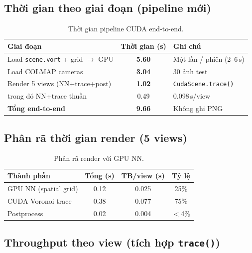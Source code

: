 \documentclass[11pt,a4paper]{article}
\begin{document}
\subsection{Thời gian theo giai đoạn (pipeline mới)}

\begin{table}[H]
\centering
\caption{Thời gian pipeline CUDA end-to-end.}
\label{tab:timing-phase}
\begin{tabular}{lcl}
\toprule
\textbf{Giai đoạn} & \textbf{Thời gian (s)} & \textbf{Ghi chú} \\
\midrule
Load \texttt{scene.vort} + grid $\rightarrow$ GPU & \textbf{5.60} & Một lần / phiên (2--6\,s) \\
Load COLMAP cameras & \textbf{3.04} & 30 ảnh test \\
Render 5 views (NN+trace+post) & \textbf{1.02} & \texttt{CudaScene.trace()} \\
\quad trong đó NN+trace thuần & 0.49 & 0.098\,s/view \\
\midrule
\textbf{Tổng end-to-end} & \textbf{9.66} & Không ghi PNG \\
\bottomrule
\end{tabular}
\end{table}

\subsection{Phân rã thời gian render (5 views)}

\begin{table}[H]
\centering
\caption{Phân rã render với GPU NN.}
\label{tab:timing-breakdown}
\begin{tabular}{lccc}
\toprule
\textbf{Thành phần} & \textbf{Tổng (s)} & \textbf{TB/view (s)} & \textbf{Tỷ lệ} \\
\midrule
GPU NN (spatial grid) & 0.12 & 0.025 & 25\% \\
CUDA Voronoi trace & 0.38 & 0.077 & 75\% \\
Postprocess & 0.02 & 0.004 & $<$4\% \\
\bottomrule
\end{tabular}
\end{table}

\subsection{Throughput theo view (tích hợp \texttt{trace()})}
\end{document}
